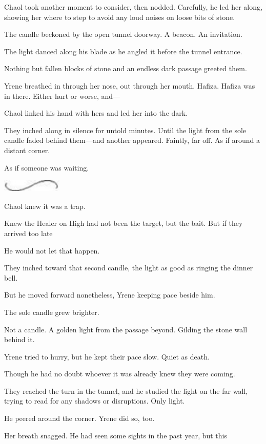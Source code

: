 Chaol took another moment to consider, then nodded. Carefully, he led her along, showing her where to step to avoid any loud noises on loose bits of stone.

The candle beckoned by the open tunnel doorway. A beacon. An invitation.

The light danced along his blade as he angled it before the tunnel entrance.

Nothing but fallen blocks of stone and an endless dark passage greeted them.

Yrene breathed in through her nose, out through her mouth. Hafiza. Hafiza was in there. Either hurt or worse, and---

Chaol linked his hand with hers and led her into the dark.

They inched along in silence for untold minutes. Until the light from the sole candle faded behind them---and another appeared. Faintly, far off. As if around a distant corner.

As if someone was waiting.

\includegraphics[width=1.12in,height=0.24in]{images/seperator}

Chaol knew it was a trap.

Knew the Healer on High had not been the target, but the bait. But if they arrived too late 

He would not let that happen.

They inched toward that second candle, the light as good as ringing the dinner bell.

But he moved forward nonetheless, Yrene keeping pace beside him.

The sole candle grew brighter.

Not a candle. A golden light from the passage beyond. Gilding the stone wall behind it.

Yrene tried to hurry, but he kept their pace slow. Quiet as death.

Though he had no doubt whoever it was already knew they were coming.

They reached the turn in the tunnel, and he studied the light on the far wall, trying to read for any shadows or disruptions. Only light.

He peered around the corner. Yrene did so, too.

Her breath snagged. He had seen some sights in the past year, but this


